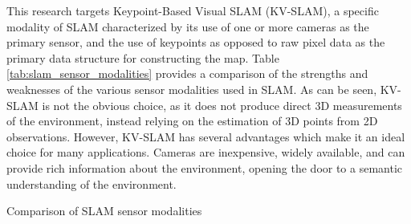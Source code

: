 This research targets Keypoint-Based Visual SLAM (KV-SLAM), a specific modality of SLAM characterized by its use of one or more cameras as the primary sensor, and the use of keypoints as opposed to raw pixel data as the primary data structure for constructing the map. Table \ref{tab:slam_sensor_modalities} provides a comparison of the strengths and weaknesses of the various sensor modalities used in SLAM. As can be seen, KV-SLAM is not the obvious choice, as it does not produce direct 3D measurements of the environment, instead relying on the estimation of 3D points from 2D observations. However, KV-SLAM has several advantages which make it an ideal choice for many applications. Cameras are inexpensive, widely available, and can provide rich information about the environment, opening the door to a semantic understanding of the environment. 

\begin{table}[ht!]
    \centering
    \caption{Comparison of SLAM sensor modalities}
    \label{tab:slam_sensor_modalities}
\end{table}